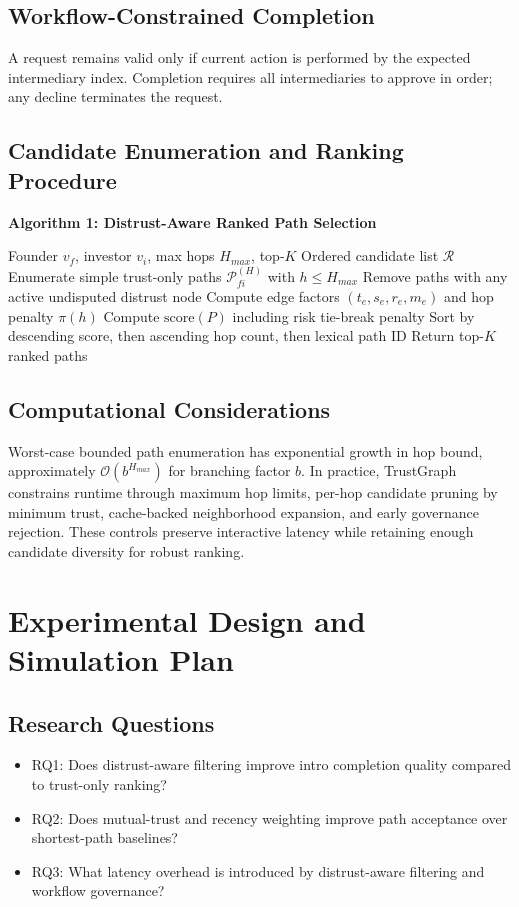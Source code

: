 \documentclass[conference]{IEEEtran}
\begin{document}
\subsection{Workflow-Constrained Completion}
A request remains valid only if current action is performed by the expected intermediary index. Completion requires all intermediaries to approve in order; any decline terminates the request.

\subsection{Candidate Enumeration and Ranking Procedure}
\noindent\textbf{Algorithm 1: Distrust-Aware Ranked Path Selection}
\begin{algorithmic}[1]
\REQUIRE Founder $v_f$, investor $v_i$, max hops $H_{max}$, top-$K$
\ENSURE Ordered candidate list $\mathcal{R}$
\STATE Enumerate simple trust-only paths $\mathcal{P}_{fi}^{(H)}$ with $h\leq H_{max}$
\STATE Remove paths with any active undisputed distrust node
    \STATE Compute edge factors $(t_e,s_e,r_e,m_e)$ and hop penalty $\pi(h)$
    \STATE Compute $\text{score}(P)$ including risk tie-break penalty
\ENDFOR
\STATE Sort by descending score, then ascending hop count, then lexical path ID
\STATE Return top-$K$ ranked paths
\end{algorithmic}

\subsection{Computational Considerations}
Worst-case bounded path enumeration has exponential growth in hop bound, approximately $\mathcal{O}(b^{H_{max}})$ for branching factor $b$. In practice, TrustGraph constrains runtime through maximum hop limits, per-hop candidate pruning by minimum trust, cache-backed neighborhood expansion, and early governance rejection. These controls preserve interactive latency while retaining enough candidate diversity for robust ranking.

\section{Experimental Design and Simulation Plan}
\subsection{Research Questions}
\begin{itemize}
    \item RQ1: Does distrust-aware filtering improve intro completion quality compared to trust-only ranking?
    \item RQ2: Does mutual-trust and recency weighting improve path acceptance over shortest-path baselines?
    \item RQ3: What latency overhead is introduced by distrust-aware filtering and workflow governance?
\end{itemize}
\end{document}
